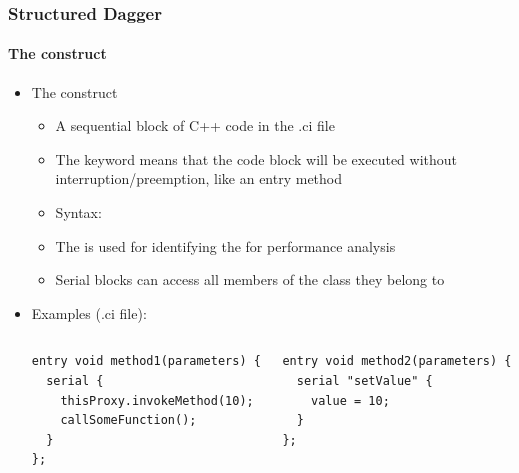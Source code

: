 \begin{frame}[fragile]
  \frametitle{Structured Dagger}
  \framesubtitle{The  construct}
  \begin{itemize}
    \item The  construct
      \begin{itemize}
        \item A sequential block of C++ code in the .ci file
        \item The keyword  means that the code block will be
          executed without interruption/preemption, like an entry method
        \item Syntax: 
        \item The  is used for identifying the
           for performance analysis
        \item Serial blocks can access all members of the class they belong to
      \end{itemize}
    \item Examples (.ci file):
  \begin{columns}
    \begin{column}{0.5\textwidth}
      \begin{lstlisting}[basicstyle=\tiny]
entry void method1(parameters) {
  serial {
    thisProxy.invokeMethod(10);
    callSomeFunction();
  }
};
      \end{lstlisting}
    \end{column}
    \begin{column}{0.5\textwidth}
      \begin{lstlisting}[basicstyle=\tiny]
entry void method2(parameters) {
  serial "setValue" {
    value = 10;
  }
};
      \end{lstlisting}
    \end{column}
  \end{columns}
  \end{itemize}
\end{frame}


